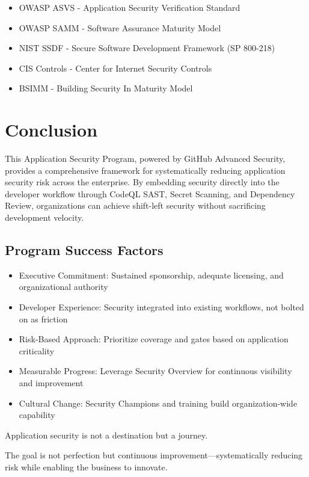 \documentclass[11pt]{article}
\begin{document}
\begin{itemize}[leftmargin=*]
\item OWASP ASVS - Application Security Verification Standard
\item OWASP SAMM - Software Assurance Maturity Model
\item NIST SSDF - Secure Software Development Framework (SP 800-218)
\item CIS Controls - Center for Internet Security Controls
\item BSIMM - Building Security In Maturity Model
\end{itemize}
\section{Conclusion}

This Application Security Program, powered by GitHub Advanced Security, provides a comprehensive framework for systematically reducing application security risk across the enterprise. By embedding security directly into the developer workflow through CodeQL SAST, Secret Scanning, and Dependency Review, organizations can achieve shift-left security without sacrificing development velocity.

\subsection{Program Success Factors}

\begin{itemize}[leftmargin=*]
\item Executive Commitment: Sustained sponsorship, adequate licensing, and organizational authority
\item Developer Experience: Security integrated into existing workflows, not bolted on as friction
\item Risk-Based Approach: Prioritize coverage and gates based on application criticality
\item Measurable Progress: Leverage Security Overview for continuous visibility and improvement
\item Cultural Change: Security Champions and training build organization-wide capability
\end{itemize}
Application security is not a destination but a journey.

The goal is not perfection but continuous improvement---systematically reducing risk while enabling the business to innovate.
\end{document}

